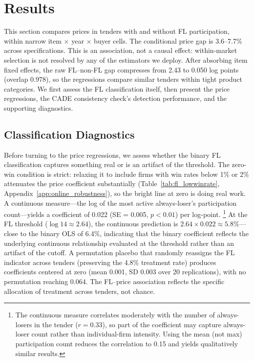 
\section{Results}
\label{sec:results}

This section compares prices in tenders with and without FL
participation, within narrow item $\times$ year $\times$ buyer cells.
The conditional price gap is 3.6--7.7\% across specifications. This
is an association, not a causal effect: within-market selection is not
resolved by any of the estimators we deploy. After absorbing item
fixed effects, the raw FL--non-FL gap compresses from 2.43 to 0.050
log points (overlap 0.978), so the regressions compare similar tenders
within tight product categories. We first assess the FL classification
itself, then present the price regressions, the CADE consistency
check's detection performance, and the supporting diagnostics.


\subsection{Classification Diagnostics}
\label{sec:class_diagnostics}

Before turning to the price regressions, we assess whether the binary
FL classification captures something real or is an artifact of the
threshold. The zero-win condition is strict: relaxing it to include
firms with win rates below 1\% or 2\% attenuates the price coefficient
substantially (Table~\ref{tab:fl_lowwinrate},
Appendix~\ref{app:online_robustness}), so the bright line at zero is
doing real work. A continuous measure---the log of the most active
always-loser's participation count---yields a coefficient of 0.022
(SE = 0.005, $p < 0.01$) per log-point.%
\footnote{The continuous measure correlates moderately with the number
of always-losers in the tender ($r = 0.33$), so part of the
coefficient may capture always-loser count rather than individual-firm
intensity. Using the mean (not max) participation count reduces the
correlation to 0.15 and yields qualitatively similar results.}
At the FL threshold ($\log 14 \approx 2.64$), the continuous prediction
is $2.64 \times 0.022 \approx 5.8\%$---close to the binary OLS of
6.4\%, indicating that the binary coefficient reflects the underlying
continuous relationship evaluated at the threshold rather than an
artifact of the cutoff. A permutation placebo that randomly reassigns
the FL indicator across tenders (preserving the 4.8\% treatment rate)
produces coefficients centered at zero (mean 0.001, SD 0.003 over 20
replications), with no permutation reaching 0.064. The FL--price
association reflects the specific allocation of treatment across
tenders, not chance.

